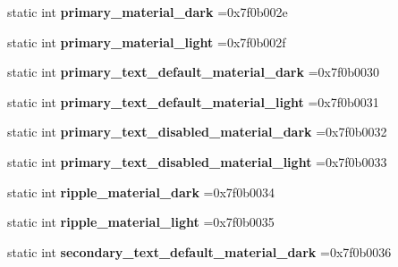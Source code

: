 \begin{DoxyCompactItemize}
static int {\bfseries primary\+\_\+material\+\_\+dark} =0x7f0b002e
\item 
\mbox{\label{classandroid_1_1support_1_1v4_1_1R_1_1color_ab3dbd27a79b158dece0503730d911884}} 
static int {\bfseries primary\+\_\+material\+\_\+light} =0x7f0b002f
\item 
\mbox{\label{classandroid_1_1support_1_1v4_1_1R_1_1color_a652bb038dea07b1f6ae6db49e5b26803}} 
static int {\bfseries primary\+\_\+text\+\_\+default\+\_\+material\+\_\+dark} =0x7f0b0030
\item 
\mbox{\label{classandroid_1_1support_1_1v4_1_1R_1_1color_a9d551e576033ee3e029618a25c2e37c5}} 
static int {\bfseries primary\+\_\+text\+\_\+default\+\_\+material\+\_\+light} =0x7f0b0031
\item 
\mbox{\label{classandroid_1_1support_1_1v4_1_1R_1_1color_a73ac3a0cd925a8f835826ecbfaf840c6}} 
static int {\bfseries primary\+\_\+text\+\_\+disabled\+\_\+material\+\_\+dark} =0x7f0b0032
\item 
\mbox{\label{classandroid_1_1support_1_1v4_1_1R_1_1color_a23eb5e1ed20f302b9660ca941e859cf4}} 
static int {\bfseries primary\+\_\+text\+\_\+disabled\+\_\+material\+\_\+light} =0x7f0b0033
\item 
\mbox{\label{classandroid_1_1support_1_1v4_1_1R_1_1color_a802b82c27f599fa16e555a88312fb3a8}} 
static int {\bfseries ripple\+\_\+material\+\_\+dark} =0x7f0b0034
\item 
\mbox{\label{classandroid_1_1support_1_1v4_1_1R_1_1color_a45e778c23642a8b755174826a04cf116}} 
static int {\bfseries ripple\+\_\+material\+\_\+light} =0x7f0b0035
\item 
\mbox{\label{classandroid_1_1support_1_1v4_1_1R_1_1color_abf4c8f1bda51c5c3dde39a82ed229895}} 
static int {\bfseries secondary\+\_\+text\+\_\+default\+\_\+material\+\_\+dark} =0x7f0b0036
\item 

\end{DoxyCompactItemize}
